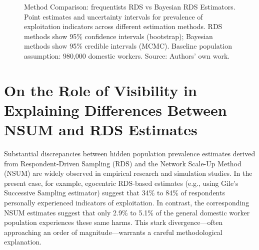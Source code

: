 \documentclass[
  12pt,
  letterpaper,
  DIV=11,
  numbers=noendperiod]{scrartcl}
\theoremstyle{plain}
\theoremstyle{definition}
\begin{document}
\begin{figure}[H]


\caption{\label{fig-method-comparison}Method Comparison: frequentists
RDS vs Bayesian RDS Estimators. Point estimates and uncertainty
intervals for prevalence of exploitation indicators across different
estimation methods. RDS methods show 95\% confidence intervals
(bootstrap); Bayesian methods show 95\% credible intervals (MCMC).
Baseline population assumption: 980,000 domestic workers. Source:
Authors' own work.}

\end{figure}%

\section{On the Role of Visibility in Explaining Differences Between
NSUM and RDS
Estimates}\label{on-the-role-of-visibility-in-explaining-differences-between-nsum-and-rds-estimates}

Substantial discrepancies between hidden population prevalence estimates
derived from Respondent-Driven Sampling (RDS) and the Network Scale-Up
Method (NSUM) are widely observed in empirical research and simulation
studies. In the present case, for example, egocentric RDS-based
estimates (e.g., using Gile's Successive Sampling estimator) suggest
that 34\% to 84\% of respondents personally experienced indicators of
exploitation. In contrast, the corresponding NSUM estimates suggest that
only 2.9\% to 5.1\% of the general domestic worker population
experiences these same harms. This stark divergence---often approaching
an order of magnitude---warrants a careful methodological explanation.
\end{document}
